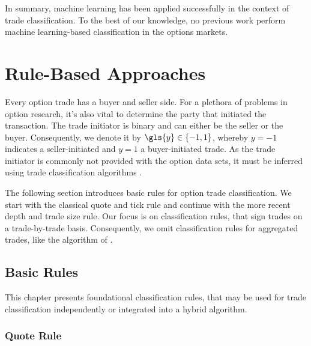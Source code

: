 In summary, machine learning has been applied successfully in the context of trade classification. To the best of our knowledge, no previous work perform machine learning-based classification in the options markets.

\newpage
\section{Rule-Based Approaches}\label{sec:rule-based-approaches}

Every option trade has a buyer and seller side. For a plethora of problems in option research, it's also vital to determine the party that initiated the transaction. The trade initiator is binary and can either be the seller or the buyer. Consequently, we denote it by $\gls{y} \in \{-1,1\}$, whereby $y=-1$ indicates a seller-initiated and $y=1$ a buyer-initiated trade. As the trade initiator is commonly not provided with the option data sets, it must be inferred using trade classification algorithms \autocite[][453]{easleyOptionVolumeStock1998}.


The following section introduces basic rules for option trade classification. We start with the classical quote and tick rule and continue with the more recent depth and trade size rule. Our focus is on classification rules, that sign trades on a trade-by-trade basis. Consequently, we omit classification rules for aggregated trades, like the  algorithm of \textcite[][1466--1468]{easleyFlowToxicityLiquidity2012}.

\subsection{Basic Rules}\label{sec:basic-rules}

This chapter presents foundational classification rules, that may be used for trade classification independently or integrated into a hybrid algorithm.

\subsubsection{Quote Rule}\label{sec:quote-rule}

